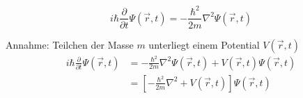   \begin{equation}
    \label{eq:11}
    \boxed{i\hbar\frac{\partial}{\partial t}\Psi(\vec{r},t)
      =-\frac{\hbar^2}{2m}\nabla^2\Psi(\vec{r},t)}
  \end{equation}


Annahme: Teilchen der Masse $m$ unterliegt einem Potential $V(\vec{r},t)$
\begin{align*}
  i\hbar\frac{\partial}{\partial t}\Psi(\vec{r},t) 
  &=-\frac{\hbar^{2}}{2m}\nabla^2\Psi(\vec{r},t)+V(\vec{r},t)\Psi(\vec{r},t)\\
  &=\left[-\frac{\hbar^{2}}{2m}\nabla^2+V(\vec{r},t)\right]\Psi(\vec{r},t)
\end{align*}





